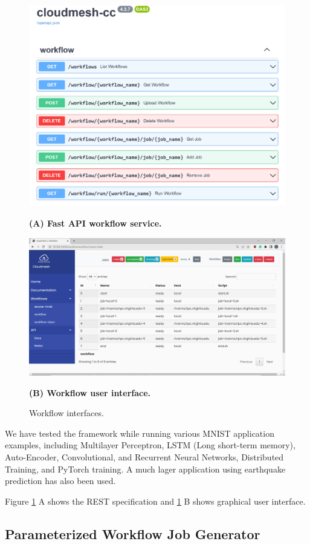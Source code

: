 \documentclass[utf8]{FrontiersinVancouver} %
\begin{document}
\begin{figure}[htb]
  \centering\includegraphics[width=0.8\columnwidth]{images/fastapi-service-highres.png}
  
  {\bf (A) Fast API workflow service.}

  \bigskip


    \centering\includegraphics[width=0.8\columnwidth]{images/cc-1.png}

    {\bf (B) Workflow user interface.}

    \caption{Workflow interfaces.}
    \label{fig:cc-3}
\end{figure}


We have tested the framework while running various MNIST application
examples, including Multilayer Perceptron, LSTM (Long short-term
memory), Auto-Encoder, Convolutional, and Recurrent Neural Networks,
Distributed Training, and PyTorch training.  A much lager application
using earthquake prediction has also been used.

Figure \ref{fig:cc-3} A shows the REST specification and
\ref{fig:cc-3} B shows graphical user interface.

\subsection{Parameterized Workflow Job Generator}
\label{sec:workflow-sbatch}
\end{document}
